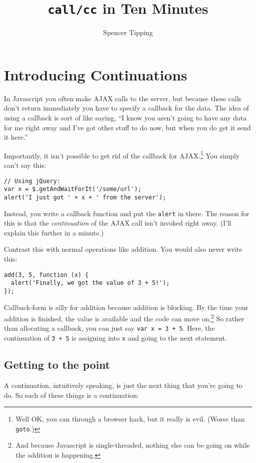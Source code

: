 \documentclass{article}
\title{{\tt call/cc} in Ten Minutes}
\author{Spencer Tipping}
\begin{document}
\maketitle{}
\tableofcontents{}

\section{Introducing Continuations}\label{sec:introducing-continuations}
  In Javascript you often make AJAX calls to the server, but because these calls don't return immediately you have to specify a callback for the data. The idea of using a callback is sort of
  like saying, ``I know you aren't going to have any data for me right away and I've got other stuff to do now, but when you do get it send it here.''

  Importantly, it isn't possible to get rid of the callback for AJAX.\footnote{Well OK, you can through a browser hack, but it really is evil. (Worse than {\tt goto}.)} You simply can't say
  this:

\begin{verbatim}
// Using jQuery:
var x = $.getAndWaitForIt('/some/url');
alert('I just got ' + x + ' from the server');
\end{verbatim}

  Instead, you write a callback function and put the {\tt alert} in there. The reason for this is that the {\em continuation} of the AJAX call isn't invoked right away. (I'll explain this
  further in a minute.)

  Contrast this with normal operations like addition. You would also never write this:

\begin{verbatim}
add(3, 5, function (x) {
  alert('Finally, we got the value of 3 + 5!');
});
\end{verbatim}

  Callback-form is silly for addition because addition is blocking. By the time your addition is finished, the value is available and the code can move on.\footnote{And because Javascript is
  single-threaded, nothing else can be going on while the addition is happening.} So rather than allocating a callback, you can just say {\tt var x = 3 + 5}. Here, the continuation of {\tt 3 +
  5} is assigning into {\tt x} and going to the next statement.

\subsection{Getting to the point}\label{sec:introducing-continuations-getting-to-the-point}
    A continuation, intuitively speaking, is just the next thing that you're going to do. So each of these things is a continuation:
\end{document}
